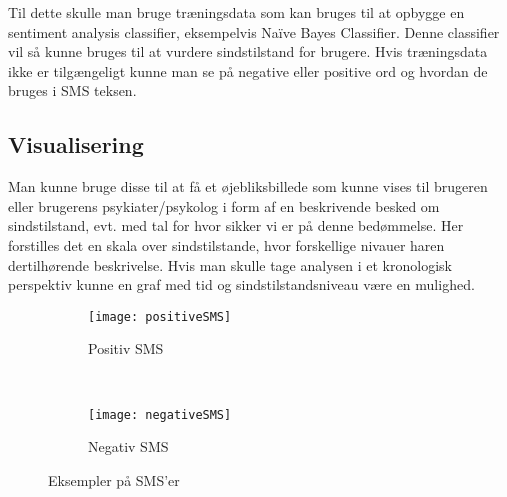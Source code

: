 Til dette skulle man bruge træningsdata som kan bruges til at opbygge en sentiment analysis classifier, eksempelvis Naïve Bayes Classifier. Denne classifier vil så kunne bruges til at vurdere sindstilstand for brugere. Hvis træningsdata ikke er tilgængeligt kunne man se på negative eller positive ord og hvordan de bruges i SMS teksen.

\subsection{Visualisering}
Man kunne bruge disse til at få et øjebliksbillede som kunne vises til brugeren eller brugerens psykiater/psykolog i form af en beskrivende besked om sindstilstand, evt. med tal for hvor sikker vi er på denne bedømmelse. Her forstilles det en skala over sindstilstande, hvor forskellige nivauer haren dertilhørende beskrivelse.
Hvis man skulle tage analysen i et kronologisk perspektiv kunne en graf med tid og sindstilstandsniveau være en mulighed. 

\begin{figure}
	\centering
	\begin{subfigure}[b]{0.3\textwidth}
		\texttt{[image: positiveSMS]}
		\caption{Positiv SMS}
	\end{subfigure}
	~
	\begin{subfigure}[b]{0.3\textwidth}
		\texttt{[image: negativeSMS]}
		\caption{Negativ SMS}
	\end{subfigure}
	\caption{Eksempler på SMS'er}
\end{figure}
	
	